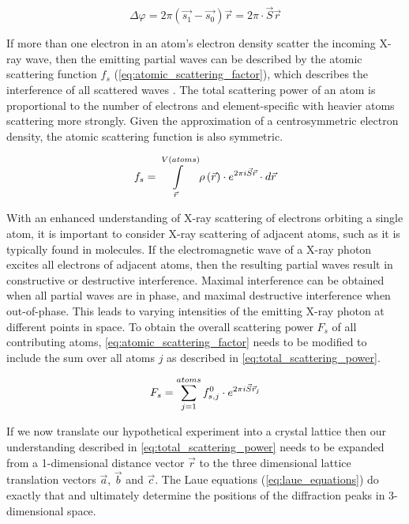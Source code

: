 \begin{equation}
    \Delta\varphi=2\pi\left(\vec{s_1}-\vec{s_0}\right)\vec{r}=2\pi \cdot \vec{S}\vec{r}
    \label{eq:phase_difference}
\end{equation}

If more than one electron in an atom's electron density scatter the incoming X-ray wave, then the emitting partial waves can be described by the atomic scattering function $f_s$ (\cref{eq:atomic_scattering_factor}), which describes the interference of all scattered waves \cite{Rupp2010-nc}. The total scattering power of an atom is proportional to the number of electrons and element-specific with heavier atoms scattering more strongly. Given the approximation of a centrosymmetric electron density, the atomic scattering function is also symmetric. 

\begin{equation}
    f_s=\int\limits_{\vec{r}}^{V(atoms)}\rho\left(\vec{r}\right) \cdot e^{2\pi\\i\vec{S}\vec{r}} \cdot d\vec{r}
    \label{eq:atomic_scattering_factor}
\end{equation}

With an enhanced understanding of X-ray scattering of electrons orbiting a single atom, it is important to consider X-ray scattering of adjacent atoms, such as it is typically found in molecules. If the electromagnetic wave of a X-ray photon excites all electrons of adjacent atoms, then the resulting partial waves result in constructive or destructive interference. Maximal interference can be obtained when all partial waves are in phase, and maximal destructive interference when out-of-phase. This leads to varying intensities of the emitting X-ray photon at different points in space. To obtain the overall scattering power $F_s$ of all contributing atoms, \cref{eq:atomic_scattering_factor} needs to be modified to include the sum over all atoms $j$ as described in \cref{eq:total_scattering_power}.

\begin{equation}
    F_s=\sum_{j=1}^{atoms}f_{s,j}^0 \cdot e^{2\pi\\i\vec{S}\vec{r}_j}
    \label{eq:total_scattering_power}
\end{equation}

If we now translate our hypothetical experiment into a crystal lattice then our understanding described in \cref{eq:total_scattering_power} needs to be expanded from a 1-dimensional distance vector $\vec{r}$ to the three dimensional lattice translation vectors $\vec{a}$, $\vec{b}$ and $\vec{c}$. The Laue equations (\cref{eq:laue_equations}) do exactly that and ultimately determine the positions of the diffraction peaks in 3-dimensional space.

